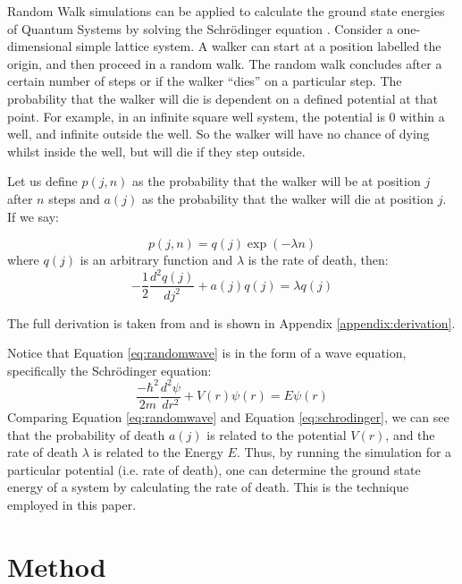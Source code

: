 \documentclass[journal]{IEEEtran}
\begin{document}
Random Walk simulations can be applied to calculate the ground state energies of
Quantum Systems by solving the Schr\"{o}dinger equation . Consider a
one-dimensional simple lattice system. A walker can start at a position labelled
the origin, and then proceed in a random walk. The random walk concludes after a
certain number of steps or if the walker ``dies'' on a particular step. The
probability that the walker will die is dependent on a defined potential at that
point. For example, in an infinite square well system, the potential is 0 within
a well, and infinite outside the well. So the walker will have no chance of
dying whilst inside the well, but will die if they step outside.

Let us define $p(j,n)$ as the probability that the walker will be at position
$j$ after $n$ steps and $a(j)$ as the probability that the walker will die at
position $j$. If we say:

\begin{equation}
  p(j,n) = q(j) \exp(-\lambda n)
  \label{eq:firsteq}
\end{equation}
where $q(j)$ is an arbitrary function and $\lambda$ is the rate of death, then:
\begin{equation}
  -\frac{1}{2} \frac{d^2q(j)}{dj^2} + a(j)q(j) = \lambda q(j)
  \label{eq:randomwave}
\end{equation}

The full derivation is taken from  and is shown in Appendix
\ref{appendix:derivation}.

Notice that Equation \ref{eq:randomwave} is in the form of a wave equation,
specifically the Schr\"{o}dinger equation:
\begin{equation}
  \label{eq:schrodinger}
  \frac{-\hbar^2}{2m}\frac{d^2 \psi}{dr^2} + V(r)\psi(r) = E\psi(r)
\end{equation}
Comparing Equation \ref{eq:randomwave} and Equation \ref{eq:schrodinger}, we can
see that the probability of death $a(j)$ is related to the potential $V(r)$,
and the rate of death $\lambda$ is related to the Energy $E$. Thus, by running
the simulation for a particular potential (i.e. rate of death), one can
determine the ground state energy of a system by calculating the rate of
death. This is the technique employed in this paper.

\section{Method}
\end{document}

